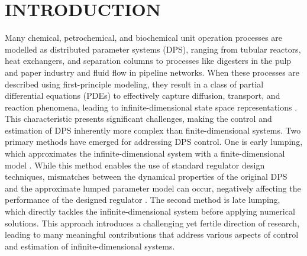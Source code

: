 \section{INTRODUCTION}

Many chemical, petrochemical, and biochemical unit operation processes are modelled as distributed parameter systems (DPS), ranging from tubular reactors, heat exchangers, and separation columns to processes like digesters in the pulp and paper industry and fluid flow in pipeline networks. When these processes are described using first-principle modeling, they result in a class of partial differential equations (PDEs) to effectively capture diffusion, transport, and reaction phenomena, leading to infinite-dimensional state space representations \autocite{ray1981advanced}. This characteristic presents significant challenges, making the control and estimation of DPS inherently more complex than finite-dimensional systems. Two primary methods have emerged for addressing DPS control. One is early lumping, which approximates the infinite-dimensional system with a finite-dimensional model \autocite{davison1976robust, francis1977linear}. While this method enables the use of standard regulator design techniques, mismatches between the dynamical properties of the original DPS and the approximate lumped parameter model can occur, negatively affecting the performance of the designed regulator \autocite{moghadam2012infinite}. The second method is late lumping, which directly tackles the infinite-dimensional system before applying numerical solutions. This approach introduces a challenging yet fertile direction of research, leading to many meaningful contributions that address various aspects of control and estimation of infinite-dimensional systems.

